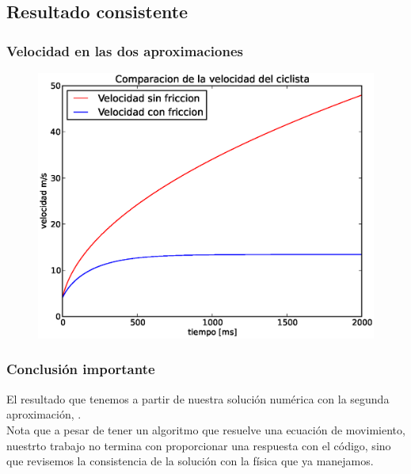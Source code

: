 \documentclass[12pt]{beamer}
\begin{document}
\subsection{Resultado consistente}

\begin{frame}
\frametitle{Velocidad en las dos aproximaciones}
\begin{figure}[H]
	\centering
	\includegraphics[scale=0.475]{Imagenes/EjerBicicleta02.eps}
\end{figure}
\end{frame}
\begin{frame}
\frametitle{Conclusión importante}
El resultado que tenemos a partir de nuestra solución numérica con la segunda aproximación, .
\\
\bigskip
\pause
Nota que a pesar de tener un algoritmo que resuelve una ecuación de movimiento, nuestrto trabajo no termina con proporcionar una respuesta con el código, \pause sino que revisemos la consistencia de la solución con la física que ya manejamos.
\end{frame}
\end{document}
